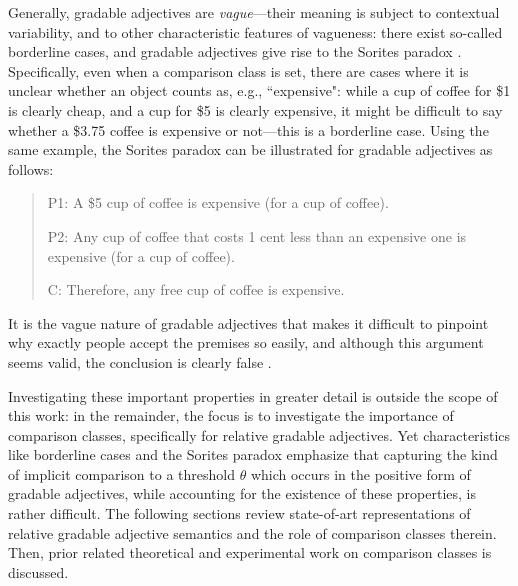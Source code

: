 Generally, gradable adjectives are \textit{vague}---their meaning is subject to contextual variability, and to other characteristic features of vagueness: there exist so-called borderline cases, and gradable adjectives give rise to the Sorites paradox \parencite{Kennedy2007}. Specifically, even when a comparison class is set, there are cases where it is unclear whether an object counts as, e.g., ``expensive": while a cup of coffee for \$1 is clearly cheap, and a cup for \$5 is clearly expensive, it might be difficult to say whether a  \$3.75 coffee is expensive or not---this is a borderline case. Using the same example, the Sorites paradox can be illustrated for gradable adjectives as follows: 
\begin{quotation}
P1: A \$5 cup of coffee is expensive (for a cup of coffee). 

P2: Any cup of coffee that costs 1 cent less than an expensive one is expensive (for a cup of coffee). 

C: Therefore, any free cup of coffee is expensive. 
\end{quotation}

It is the vague nature of gradable adjectives that makes it difficult to pinpoint why exactly people accept the premises so easily, and although this argument seems valid, the conclusion is clearly false \parencite[see][for more details]{Kennedy2007}.

Investigating these important properties in greater detail is outside the scope of this work: in the remainder, the focus is to investigate the importance of comparison classes, specifically for relative gradable adjectives. Yet characteristics like borderline cases and the Sorites paradox emphasize that capturing the kind of implicit comparison to a threshold $\theta$ which occurs in the positive form of gradable adjectives, while accounting for the existence of these properties, is rather difficult. 
The following sections review state-of-art representations of relative gradable adjective semantics and the role of comparison classes therein. Then, prior related theoretical and experimental work on comparison classes is discussed. 


